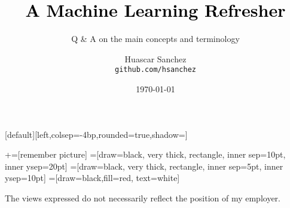 

\usepackage{framed}
\usepackage[inline]{enumitem}
\usepackage[backend=bibtex]{biblatex}
\usepackage{amssymb}
\usepackage{amsmath}
\usepackage{gensymb}  %

\newcommand{\norm}[1]{\left\lVert #1 \right\rVert}

\usepackage{multirow}
\usepackage{booktabs}

\usepackage{mathtools}
\providecommand\given{}
\DeclarePairedDelimiterXPP\Aver[1]{\mathbb{E}}{[}{]}{}{
\renewcommand\given{  \nonscript\:
  \delimsize\vert
  \nonscript\:
  \mathopen{}
  \allowbreak}
#1
}


\title[]{\Huge \textbf{\textcolor{black}{A Machine Learning Refresher}}}
\subtitle{\Large Q \& A on the main concepts and terminology}
\author[HAS]{
\parbox[t]{1.5in}{Huascar Sanchez \\\small\texttt{github.com/hsanchez}} %
}

\date{\today}

\makeatletter
{}[default][left,colsep=-4bp,rounded=true,shadow=\beamer@themerounded@shadow]
\makeatother


\newcommand\marktopleft[1]{%
    \tikz[overlay,remember picture]
        \node (marker-#1-a) at (-.3em,.3em) {};%
}
\newcommand\markbottomright[2]{%
    \tikz[overlay,remember picture]
        \node (marker-#1-b) at (0em,0em) {};%
}
+=[remember picture]
 =[draw=black, very thick, rectangle, inner sep=10pt, inner ysep=20pt]
 =[draw=black, very thick, rectangle, inner sep=5pt, inner ysep=10pt]
 =[draw=black,fill=red, text=white]

\begin{frame}
\maketitle
\tiny\hspace{1em}The views expressed do not necessarily reflect the position of my employer.
\end{frame}

